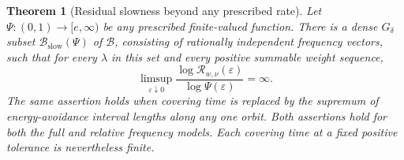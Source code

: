 \documentclass[11pt,letterpaper]{article}
\newtheorem{theorem}{Theorem}[section]
\theoremstyle{definition}
\theoremstyle{remark}
\newcommand{\eps}{\varepsilon}
\newcommand{\1}{\mathbf 1}
\begin{document}
\begin{theorem}[Residual slowness beyond any prescribed rate]
\label{p02:thm:residual}
Let $\Psi:(0,1)\longrightarrow[e,\infty)$ be any prescribed
finite-valued function. There is a dense $G_\delta$ subset
$\mathcal B_{\mathrm{slow}}(\Psi)$ of $\mathcal B$, consisting of
rationally independent frequency vectors, such that for every
$\lambda$ in this set and every positive summable weight sequence,
\begin{equation}\label{p02:eq:residual-slow}
 \limsup_{\eps\downarrow0}
 \frac{\log\mathcal R_{w,\nu}(\eps)}{\log\Psi(\eps)}=\infty.
\end{equation}
The same assertion holds when covering time is replaced by the
supremum of energy-avoidance interval lengths along any one orbit.
Both assertions hold for both the full and relative frequency models.
Each covering time at a fixed positive tolerance is nevertheless
finite.
\end{theorem}
\end{document}
